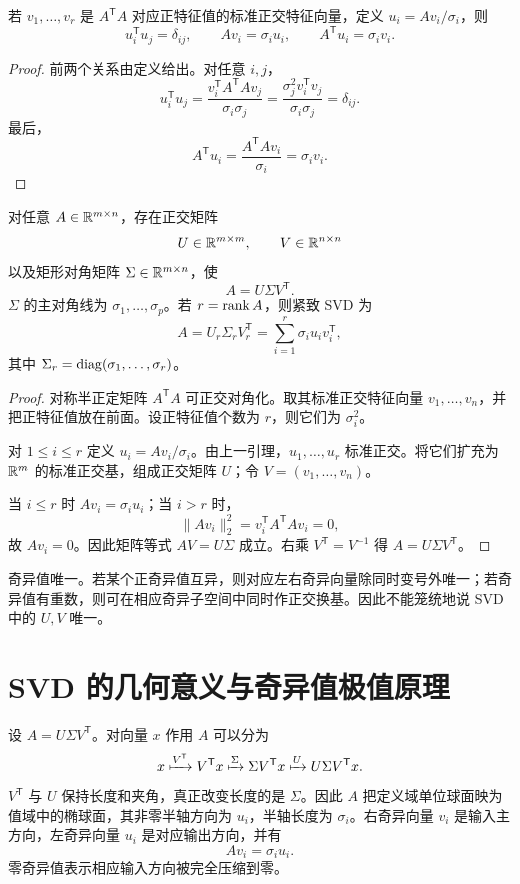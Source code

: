 \begin{lemma}[非零奇异向量的正交关系]
若 $v_1,\ldots,v_r$ 是 $A^{\mathsf T}A$ 对应正特征值的标准正交特征向量，定义 $u_i=Av_i/\sigma_i$，则
\[
u_i^{\mathsf T}u_j=\delta_{ij},
\qquad
Av_i=\sigma_i u_i,
\qquad
A^{\mathsf T}u_i=\sigma_i v_i.
\]
\end{lemma}
\begin{proof}
前两个关系由定义给出。对任意 $i,j$，
\[
u_i^{\mathsf T}u_j
=\frac{v_i^{\mathsf T}A^{\mathsf T}Av_j}{\sigma_i\sigma_j}
=\frac{\sigma_j^2v_i^{\mathsf T}v_j}{\sigma_i\sigma_j}
=\delta_{ij}.
\]
最后，
\[
A^{\mathsf T}u_i
=\frac{A^{\mathsf T}Av_i}{\sigma_i}
=\sigma_i v_i.
\]
\end{proof}

\begin{theorem}[奇异值分解定理]
对任意 $A\in\mathbb{R}^{m\times n}$，存在正交矩阵
\[
U\in\mathbb{R}^{m\times m},\qquad V\in\mathbb{R}^{n\times n}
\]
以及矩形对角矩阵 $\Sigma\in\mathbb{R}^{m\times n}$，使
\[
A=U\Sigma V^{\mathsf T}.
\]
$\Sigma$ 的主对角线为 $\sigma_1,\ldots,\sigma_p$。若 $r=\operatorname{rank} A$，则紧致 SVD 为
\[
A=U_r\Sigma_rV_r^{\mathsf T}
=\sum_{i=1}^r\sigma_i u_iv_i^{\mathsf T},
\]
其中 $\Sigma_r=\operatorname{diag}(\sigma_1,\ldots,\sigma_r)$。
\end{theorem}
\begin{proof}
对称半正定矩阵 $A^{\mathsf T}A$ 可正交对角化。取其标准正交特征向量 $v_1,\ldots,v_n$，并把正特征值放在前面。设正特征值个数为 $r$，则它们为 $\sigma_i^2$。

对 $1\le i\le r$ 定义 $u_i=Av_i/\sigma_i$。由上一引理，$u_1,\ldots,u_r$ 标准正交。将它们扩充为 $\mathbb{R}^m$ 的标准正交基，组成正交矩阵 $U$；令 $V=(v_1,\ldots,v_n)$。

当 $i\le r$ 时 $Av_i=\sigma_iu_i$；当 $i>r$ 时，
\[
\lVert Av_i\rVert_2^2=v_i^{\mathsf T}A^{\mathsf T}Av_i=0,
\]
故 $Av_i=0$。因此矩阵等式 $AV=U\Sigma$ 成立。右乘 $V^{\mathsf T}=V^{-1}$ 得 $A=U\Sigma V^{\mathsf T}$。
\end{proof}

\begin{remark}
奇异值唯一。若某个正奇异值互异，则对应左右奇异向量除同时变号外唯一；若奇异值有重数，则可在相应奇异子空间中同时作正交换基。因此不能笼统地说 SVD 中的 $U,V$ 唯一。
\end{remark}

\section{SVD 的几何意义与奇异值极值原理}

设 $A=U\Sigma V^{\mathsf T}$。对向量 $x$ 作用 $A$ 可以分为
\[
x\xmapsto{V^{\mathsf T}}V^{\mathsf T}x
\xmapsto{\Sigma}\Sigma V^{\mathsf T}x
\xmapsto{U}U\Sigma V^{\mathsf T}x.
\]
$V^{\mathsf T}$ 与 $U$ 保持长度和夹角，真正改变长度的是 $\Sigma$。因此 $A$ 把定义域单位球面映为值域中的椭球面，其非零半轴方向为 $u_i$，半轴长度为 $\sigma_i$。右奇异向量 $v_i$ 是输入主方向，左奇异向量 $u_i$ 是对应输出方向，并有
\[
Av_i=\sigma_i u_i.
\]
零奇异值表示相应输入方向被完全压缩到零。


